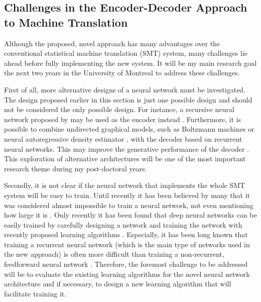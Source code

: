 \documentclass[11pt, oneside]{essay}
\begin{document}
\subsection{Challenges in the Encoder-Decoder Approach to
Machine Translation}
\label{sec:challenges}

Although the proposed, novel approach has many advantages over
the conventional statistical machine translation (SMT) system,
many challenges lie ahead before fully implementing the new
system. It will be my main research goal the next two years in
the University of Montreal to address these challenges.

First of all, more alternative designs of a neural network must
be investigated. The design proposed earlier in this section is
just one possible design and should not be considered the only
possible design. For instance, a recursive neural network
proposed by \citet{Socher2011} may be used as the encoder instead
\citep{Kalchbrenner2012}. Furthermore, it is possible to combine
undirected graphical models, such as Boltzmann machines
\citep{Ackley1985} or neural autoregressive density estimator
\citep[NADE,][]{Larochelle2011}, with the decoder based on
recurrent neural networks. This may improve the generative
performance of the decoder \citep[see, e.g.,][]{Bengio2013rec}.
This exploration of alternative architectures will be one of the
most important research theme during my post-doctoral years.
      
Secondly, it is not clear if the neural network that
implements the whole SMT system will be easy to train. Until
recently it has been believed by many that it was considered
almost impossible to train a neural
network, not even mentioning how large it is \citep[see,
e.g.,][]{Bengio2009a}. Only recently it has been found that
deep neural networks can be easily trained by carefully designing
a network \citep[see,
e.g.,][]{Hinton2012sp,Goodfellow2013,Gulcehre2013} and training
the network with recently proposed learning algorithms \citep[see,
e.g.,][]{Martens2012,Hinton2012,Amari1998}. Especially, it has
been long known that training
a recurrent neural network (which is the
main type of networks used in the new approach) is
often more difficult than training a non-recurrent,
feedforward neural network \citep[see,
e.g.,][]{Bengio1994,Sutskever2011,hochreiter1997long}. Therefore,
the foremost challenge to be addressed will be to evaluate
the existing learning algorithms for the novel neural network
architecture and if necessary, to design a new learning
algorithm that will facilitate training it.
\end{document}
